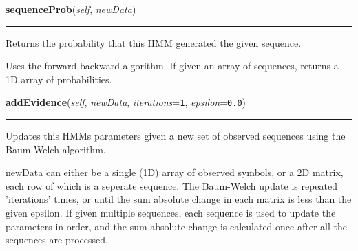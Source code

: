     \label{QSTK:qstklearn:hmm:HMMLearner:sequenceProb}

    \vspace{0.5ex}

\hspace{.8\funcindent}\begin{boxedminipage}{\funcwidth}

    \raggedright \textbf{sequenceProb}(\textit{self}, \textit{newData})

    \vspace{-1.5ex}

    \rule{\textwidth}{0.5\fboxrule}
\setlength{\parskip}{2ex}
    Returns the probability that this HMM generated the given sequence.

    Uses the forward-backward algorithm.  If given an array of sequences, 
    returns a 1D array of probabilities.

\setlength{\parskip}{1ex}
    \end{boxedminipage}

    \label{QSTK:qstklearn:hmm:HMMLearner:addEvidence}

    \vspace{0.5ex}

\hspace{.8\funcindent}\begin{boxedminipage}{\funcwidth}

    \raggedright \textbf{addEvidence}(\textit{self}, \textit{newData}, \textit{iterations}={\tt 1}, \textit{epsilon}={\tt 0.0})

    \vspace{-1.5ex}

    \rule{\textwidth}{0.5\fboxrule}
\setlength{\parskip}{2ex}
    Updates this HMMs parameters given a new set of observed sequences 
    using the Baum-Welch algorithm.

    newData can either be a single (1D) array of observed symbols, or a 2D 
    matrix, each row of which is a seperate sequence. The Baum-Welch update
    is repeated 'iterations' times, or until the sum absolute change in 
    each matrix is less than the given epsilon.  If given multiple 
    sequences, each sequence is used to update the parameters in order, and
    the sum absolute change is calculated once after all the sequences are 
    processed.

\setlength{\parskip}{1ex}
    \end{boxedminipage}

